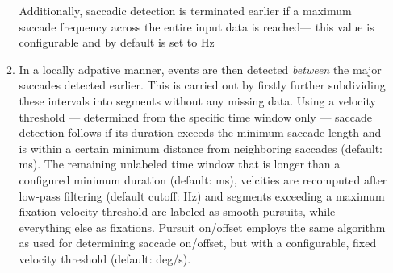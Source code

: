 \documentclass[10pt,a4paper]{extarticle}
\begin{document}
\begin{enumerate}
\begin{enumerate}
 Additionally, saccadic detection is terminated earlier if a maximum saccade frequency across the entire input data is reached--- this value is configurable and by default is set to \unit[2]{Hz}
 
 \item In a locally adpative manner, events are then detected \textit{between} the major saccades detected earlier. This is carried out by firstly further subdividing these intervals into segments without any missing data. Using a velocity threshold --- determined from the specific time window only --- saccade detection follows if its duration exceeds the minimum saccade length and is within a certain minimum distance from neighboring saccades (default: \unit[130]{ms}). 
 The remaining unlabeled time window that is longer than a configured minimum duration (default: \unit[40]{ms}), velcities are recomputed after low-pass filtering (default cutoff: \unit[4]{Hz}) and segments exceeding a maximum fixation velocity threshold are labeled as smooth pursuits, while everything else as fixations. Pursuit on/offset employs the same algorithm as \citet{Nystrom2010AnData} used for determining saccade on/offset, but with a configurable, fixed velocity threshold (default: \unit[2]{deg/s}). 
   
\end{enumerate}
\end{enumerate}
\end{document}
